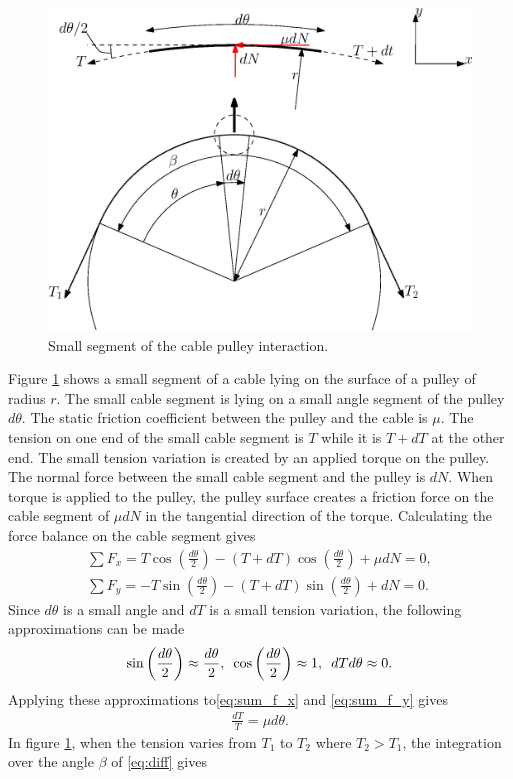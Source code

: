 \documentclass[10pt,cleanfoot]{asme2ej}
\newcommand{\hquad}{\hspace{0.5em}}
\begin{document}
\begin{figure}
    \centering
    \includegraphics[width = 0.5\columnwidth]{capstan_equation.eps}
    \caption{Small segment of the cable pulley interaction.}
    \label{fig:friction_fig}
\end{figure}
\par
Figure \ref{fig:friction_fig} shows a small  segment of a cable lying on the surface of a pulley of radius $r$. The small cable segment is lying on a small angle segment of the pulley $d\theta$. The static friction coefficient between the pulley and the cable is $\mu$. The tension on one end of the small cable segment is $T$ while it is $T+dT$ at the other end. The small tension variation is created by an applied torque on the pulley. The normal force between the small cable segment and the pulley  is $dN$. When torque is applied to the pulley, the pulley surface creates a friction force on the cable segment of $\mu dN$ in the tangential direction of the torque. Calculating the force balance on the cable segment gives 
\begin{align}
    \sum F_x = T\cos\left(\frac{d\theta}{2}\right) - (T+dT)\cos\left(\frac{d\theta}{2}\right) + \mu dN =0,\label{eq:sum_f_x}\\
    \sum F_y = -T\sin\left(\frac{d\theta}{2}\right)-(T+dT)\sin\left(\frac{d\theta}{2}\right)+dN = 0.\label{eq:sum_f_y}
\end{align}
Since $d\theta$ is a small angle and $dT$ is a small tension variation, the following approximations can be made
\begin{align}
    \sin\left(\frac{d\theta}{2}\right)\approx \frac{d\theta}{2},\hquad \cos\left(\frac{d\theta}{2}\right)\approx 1,\hquad dTd\theta \approx 0. 
\end{align}
Applying these approximations to\eqref{eq:sum_f_x} and \eqref{eq:sum_f_y} gives
\begin{align}
    \frac{dT}{T} = \mu d\theta. \label{eq:diff}
\end{align}
In figure \ref{fig:friction_fig}, when the tension varies from $T_1$ to $T_2$ where $T_2>T_1$, the integration over the angle $\beta$ of \eqref{eq:diff} gives
\end{document}
